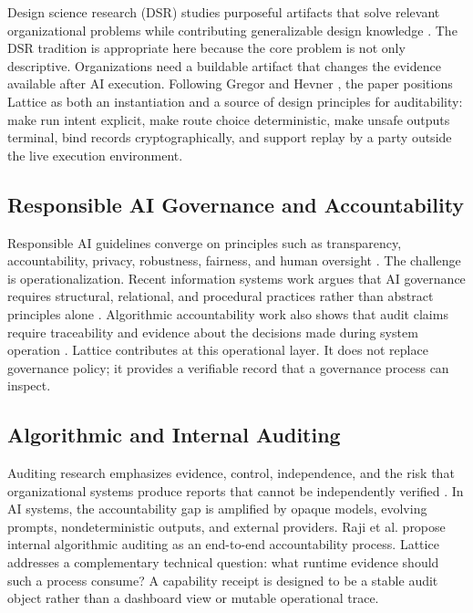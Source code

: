 \documentclass[conference]{IEEEtran}
\begin{document}
Design science research (DSR) studies purposeful artifacts that solve relevant
organizational problems while contributing generalizable design knowledge
\cite{march1995design,hevner2004dsr,peffers2007dsrm}. The DSR tradition is
appropriate here because the core problem is not only descriptive. Organizations
need a buildable artifact that changes the evidence available after AI
execution. Following Gregor and Hevner \cite{gregor2013dsr}, the paper positions Lattice as both
an instantiation and a source of design principles for auditability: make run
intent explicit, make route choice deterministic, make unsafe outputs terminal,
bind records cryptographically, and support replay by a party outside the live
execution environment.

\subsection{Responsible AI Governance and Accountability}

Responsible AI guidelines converge on principles such as transparency,
accountability, privacy, robustness, fairness, and human oversight
\cite{jobin2019global,floridi2018ai4people,nistairmf}. The challenge is
operationalization. Recent information systems work argues that AI governance
requires structural, relational, and procedural practices rather than abstract
principles alone \cite{berente2021managingai}. Algorithmic accountability work
also shows that audit claims require traceability and evidence about the
decisions made during system operation \cite{diakopoulos2016accountability,
wieringa2020accounting,kroll2021traceability}. Lattice contributes at this
operational layer. It does not replace governance policy; it provides a
verifiable record that a governance process can inspect.

\subsection{Algorithmic and Internal Auditing}

Auditing research emphasizes evidence, control, independence, and the risk that
organizational systems produce reports that cannot be independently verified
\cite{power1997audit}. In AI systems, the accountability gap is amplified by
opaque models, evolving prompts, nondeterministic outputs, and external
providers. Raji et al. \cite{raji2020accountability} propose internal algorithmic auditing
as an end-to-end accountability process. Lattice addresses a complementary
technical question: what runtime evidence should such a process consume? A
capability receipt is designed to be a stable audit object rather than a
dashboard view or mutable operational trace.
\end{document}
